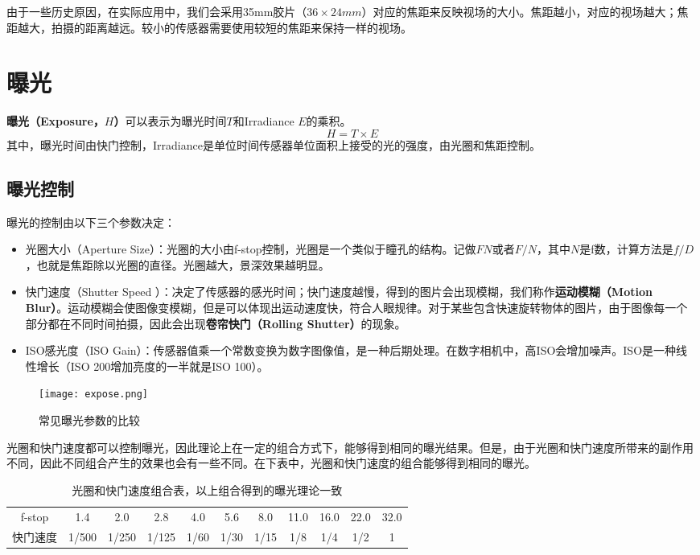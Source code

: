 \documentclass[openany]{progbookcn}
\begin{document}
由于一些历史原因，在实际应用中，我们会采用35mm胶片（$36\times 24 mm$）对应的焦距来反映视场的大小。焦距越小，对应的视场越大；焦距越大，拍摄的距离越远。较小的传感器需要使用较短的焦距来保持一样的视场。

\section{曝光}

\textbf{曝光（Exposure，$H$）}可以表示为曝光时间$T$和Irradiance $E$的乘积。
\begin{equation}
	H=T\times E
\end{equation}
其中，曝光时间由快门控制，Irradiance是单位时间传感器单位面积上接受的光的强度，由光圈和焦距控制。

\subsection{曝光控制}

曝光的控制由以下三个参数决定：
\begin{itemize}
	\item 光圈大小（Aperture Size）：光圈的大小由f-stop控制，光圈是一个类似于瞳孔的结构。记做$FN$或者$F/N$，其中$N$是f数，计算方法是$f/D$，也就是焦距除以光圈的直径。光圈越大，景深效果越明显。
	\item 快门速度（Shutter Speed ）：决定了传感器的感光时间；快门速度越慢，得到的图片会出现模糊，我们称作\textbf{运动模糊（Motion Blur）}。运动模糊会使图像变模糊，但是可以体现出运动速度快，符合人眼规律。对于某些包含快速旋转物体的图片，由于图像每一个部分都在不同时间拍摄，因此会出现\textbf{卷帘快门（Rolling Shutter）}的现象。
	\item ISO感光度（ISO Gain）：传感器值乘一个常数变换为数字图像值，是一种后期处理。在数字相机中，高ISO会增加噪声。ISO是一种线性增长（ISO 200增加亮度的一半就是ISO 100）。
\end{itemize}

\begin{figure}[H]
	\centering
	\texttt{[image: expose.png]}
	\caption{常见曝光参数的比较}
	\label{fig:expose}
\end{figure}

光圈和快门速度都可以控制曝光，因此理论上在一定的组合方式下，能够得到相同的曝光结果。但是，由于光圈和快门速度所带来的副作用不同，因此不同组合产生的效果也会有一些不同。在下表中，光圈和快门速度的组合能够得到相同的曝光。

\begin{table}[H]
	\centering
	\begin{tabular}{ccccccccccc}
		\hline
		f-stop & 1.4   & 2.0   & 2.8   & 4.0  & 5.6  & 8.0  & 11.0 & 16.0 & 22.0 & 32.0 \\
		快门速度   & 1/500 & 1/250 & 1/125 & 1/60 & 1/30 & 1/15 & 1/8  & 1/4  & 1/2  & 1 \\	\hline
	\end{tabular}
	\caption{光圈和快门速度组合表，以上组合得到的曝光理论一致}
\end{table}
\end{document}
